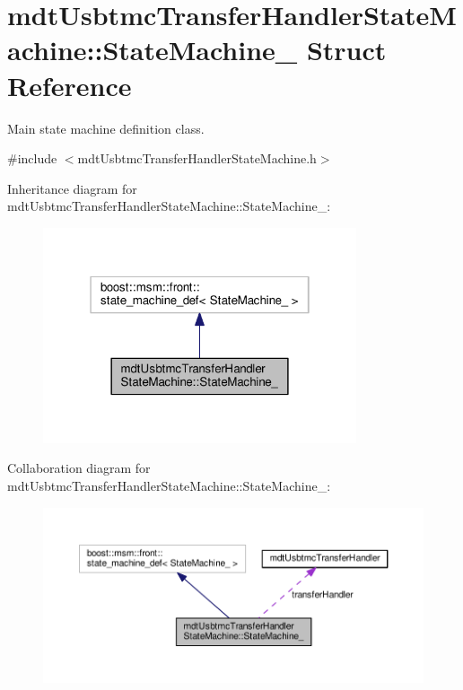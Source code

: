 \hypertarget{structmdt_usbtmc_transfer_handler_state_machine_1_1_state_machine__}{\section{mdt\-Usbtmc\-Transfer\-Handler\-State\-Machine\-:\-:State\-Machine\-\_\- Struct Reference}
\label{structmdt_usbtmc_transfer_handler_state_machine_1_1_state_machine__}
}


Main state machine definition class.  




{\ttfamily \#include $<$mdt\-Usbtmc\-Transfer\-Handler\-State\-Machine.\-h$>$}



Inheritance diagram for mdt\-Usbtmc\-Transfer\-Handler\-State\-Machine\-:\-:State\-Machine\-\_\-\-:
\nopagebreak
\begin{figure}[H]
\begin{center}
\leavevmode
\includegraphics[width=262pt]{structmdt_usbtmc_transfer_handler_state_machine_1_1_state_machine____inherit__graph}
\end{center}
\end{figure}


Collaboration diagram for mdt\-Usbtmc\-Transfer\-Handler\-State\-Machine\-:\-:State\-Machine\-\_\-\-:
\nopagebreak
\begin{figure}[H]
\begin{center}
\leavevmode
\includegraphics[width=350pt]{structmdt_usbtmc_transfer_handler_state_machine_1_1_state_machine____coll__graph}
\end{center}
\end{figure}
